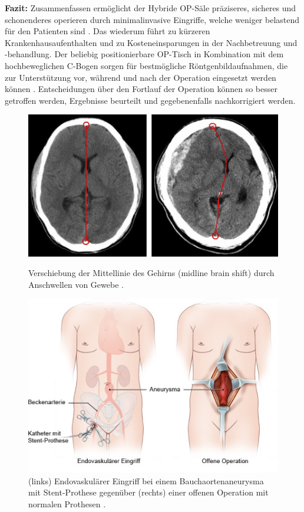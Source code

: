 \textbf{Fazit:} Zusammenfassen ermöglicht der Hybride OP-Säle präziseres, sicheres und schonenderes operieren durch minimalinvasive Eingriffe, welche weniger belastend für den Patienten sind \cite{DresdnerUniklinikum}. Das wiederum  führt zu kürzeren Krankenhausaufenthalten und zu Kosteneinsparungen in der Nachbetreuung und -behandlung. Der beliebig positionierbare OP-Tisch in Kombination mit dem hochbeweglichen C-Bogen sorgen für bestmögliche Röntgenbildaufnahmen, die zur Unterstützung vor, während und nach der Operation eingesetzt werden können \cite{DresdnerUniklinikum}. Entscheidungen über den Fortlauf der Operation können so besser getroffen werden, Ergebnisse beurteilt und gegebenenfalls nachkorrigiert werden.

\begin{figure}[!htb]
	\includegraphics[width=\linewidth]{Content/Pictures/brainshift.png}
	\caption{Verschiebung der Mittellinie des Gehirns (midline brain shift) durch Anschwellen von Gewebe \cite{BrainShiftImage}.}
	\label{fig:brainshift}
	\endminipage\hfill
	\includegraphics[width=\linewidth]{Content/Pictures/bauchaorten.png}
	\caption{(links) Endovaskulärer Eingriff bei einem Bauchaortenaneurysma mit Stent-Prothese gegenüber (rechts) einer offenen Operation mit normalen Prothesen \cite{BauaortenaneurysmaBild}.}
	\label{fig:bauchaorten}
	\endminipage
\end{figure}